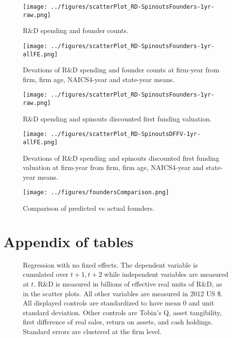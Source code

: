 \documentclass[12pt,english]{article}
\theoremstyle{remark}
\begin{document}
\begin{figure}[p]
	\centering
	\texttt{[image: ../figures/scatterPlot\_RD-SpinoutsFounders-1yr-raw.png]}
	\caption{R\&D spending and founder counts.}
	\label{scatter_rd_foundercounts}
\end{figure}

\begin{figure}[p]
	\centering
	\texttt{[image: ../figures/scatterPlot\_RD-SpinoutsFounders-1yr-allFE.png]}
	\caption{Devations of R\&D spending and founder counts at firm-year from firm, firm age, NAICS4-year and state-year means.}
	\label{scatter_rd_foundercounts_d}
\end{figure}


\begin{figure}[p]
	\centering
	\texttt{[image: ../figures/scatterPlot\_RD-SpinoutsFounders-1yr-raw.png]}
	\caption{R\&D spending and spinouts discounted first funding valuation.}
	\label{scatter_rd_dffv}
\end{figure}


\begin{figure}[p]
	\centering
	\texttt{[image: ../figures/scatterPlot\_RD-SpinoutsDFFV-1yr-allFE.png]}
	\caption{Devations of R\&D spending and spinouts discounted first funding valuation at firm-year from firm, firm age, NAICS4-year and state-year means.}
	\label{scatter_rd_dffv_d}
\end{figure}

\begin{figure}[p]
	\centering
	\texttt{[image: ../figures/foundersComparison.png]}
	\caption{Comparison of predicted vs actual founders.}
	\label{foundersComparison}
\end{figure}

\break
\section{Appendix of tables}

\renewcommand\thefigure{\thesection.\arabic{figure}}  
\setcounter{figure}{0}

\begin{figure}[p]
	\centering
	
	\caption{Regression with no fixed effects. The dependent variable is cumulated over $t+1,t+2$ while independent variables are measured at $t$. R\&D is measured in billions of effective real units of R\&D, as in the scatter plots. All other variables are measured in 2012 US \$. All displayed controls are standardized to have mean 0 and unit standard deviation. Other controls are Tobin's Q, asset tangibility, first difference of real sales, return on assets, and cash holdings. Standard errors are clustered at the firm level.}
	\label{regs_allSpinouts_nofe}
\end{figure}
\end{document}
